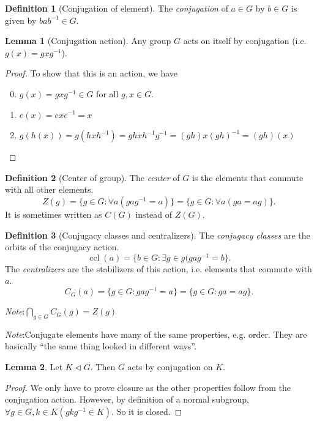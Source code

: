 \documentclass[a4paper]{article}
\theoremstyle{definition}
\newtheorem*{defi}{Definition}
\newtheorem*{lemma}{Lemma}
\newcommand{\note}{\noindent \emph{Note}:\;}
\DeclareMathOperator\ccl{ccl}
\begin{document}
\begin{defi}[Conjugation of element]
  The \emph{conjugation} of $a\in G$ by $b\in G$ is given by $bab^{-1}\in G$.
\end{defi}

\begin{lemma}[Conjugation action]
  Any group $G$ acts on itself by conjugation (i.e. $g(x) = gxg^{-1}$).
\end{lemma}

\begin{proof}
  To show that this is an action, we have
  \begin{enumerate}[label=\arabic{*}.]
    \setcounter{enumi}{-1}
  \item $g(x) = gxg^{-1} \in G$ for all $g, x\in G$.
  \item $e(x) = exe^{-1} = x$
  \item $g(h(x)) = g(hxh^{-1}) = ghxh^{-1}g^{-1} = (gh)x(gh)^{-1} = (gh)(x)$
  \end{enumerate}
\end{proof}

\begin{defi}[Center of group]
  The \emph{center} of $G$ is the elements that commute with all other elements.
  \[
  Z(g) = \{g\in G: \forall a(gag^{-1} = a)\} = \{g\in G: \forall a(ga = ag)\}.
  \]
It is sometimes written as $C(G)$ instead of $Z(G)$.
\end{defi}

\begin{defi}[Conjugacy classes and centralizers]
  The \emph{conjugacy classes} are the orbits of the conjugacy action.
  \[
  \ccl(a) = \{b\in G: \exists g\in g(gag^{-1} = b\}.
  \]
  The \emph{centralizers} are the stabilizers of this action, i.e. elements that commute with $a$.
  \[
  C_G(a) = \{g\in G: gag^{-1} = a\} = \{g\in G: ga = ag\}.
  \]
\end{defi}

\note $\bigcap_{g\in G} C_G(g) = Z(g)$

\note Conjugate elements have many of the same properties, e.g. order. They are basically ``the same thing looked in different ways''.

\begin{lemma}
  Let $K\lhd G$. Then $G$ acts by conjugation on $K$.
\end{lemma}

\begin{proof}
  We only have to prove closure as the other properties follow from the conjugation action. However, by definition of a normal subgroup, $\forall g\in G, k\in K(gkg^{-1}\in K)$.  So it is closed.
\end{proof}
\end{document}
